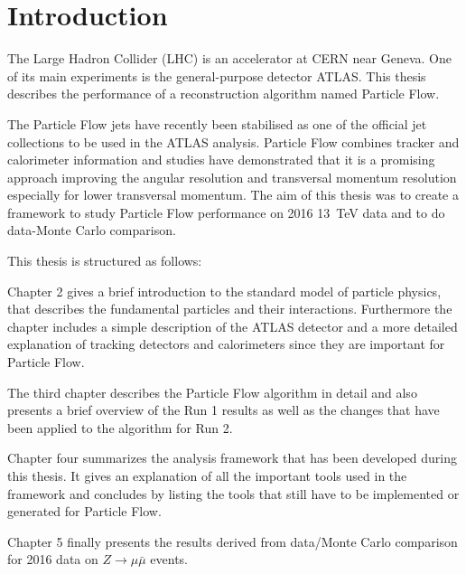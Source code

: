 \chapter{Introduction}
\label{sec:intro}

The Large Hadron Collider (LHC) is an accelerator at CERN near Geneva. One of its main experiments is the general-purpose detector ATLAS. This thesis describes the performance of a reconstruction algorithm named Particle Flow.


The Particle Flow jets have recently been stabilised as one of the official jet collections to be used in the ATLAS analysis. Particle Flow combines tracker and calorimeter information and studies have demonstrated that it is a promising approach improving the angular resolution and transversal momentum resolution especially for lower transversal momentum. The aim of this thesis was to create a framework to study Particle Flow performance on 2016 \SI{13}{\TeV} data and to do data-Monte Carlo comparison.

This thesis is structured as follows:

Chapter 2 gives a brief introduction to the standard model of particle physics, that describes the fundamental particles and their interactions. Furthermore the chapter includes a simple description of the ATLAS detector and a more detailed explanation of tracking detectors and calorimeters since they are important for Particle Flow.

The third chapter describes the Particle Flow algorithm in detail and also presents a brief overview of the Run 1 results as well as the changes that have been applied to the algorithm for Run 2.

Chapter four summarizes the analysis framework that has been developed during this thesis. It gives an explanation of all the important tools used in the framework and concludes by listing the tools that still have to be implemented or generated for Particle Flow.

Chapter 5 finally presents the results derived from data/Monte Carlo comparison for 2016 data on $Z\rightarrow \mu \bar{\mu}$ events.




